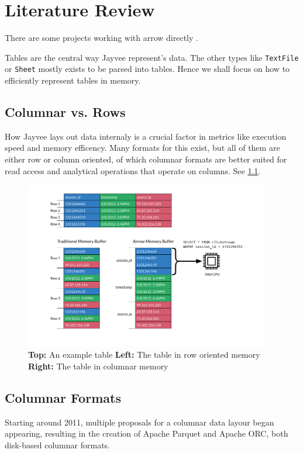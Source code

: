 \chapter{Literature Review}
\label{chapter:Literature}

There are some projects working with arrow directly
\autocite{Ahmad2020}
\autocite{Peltenburg2021}
\autocite{Grossman2022}.

Tables are the central way Jayvee represent's data.
The other types like \Verb|TextFile| or \Verb|Sheet| mostly exists to be parsed into tables.
Hence %
we shall focus on how to efficiently represent tables in memory.

\section{Columnar vs. Rows}
\label{section:column_vs_row}
How Jayvee lays out data internaly is a crucial factor in metrics like execution speed and memory efficency.
Many formats for this exist, but all of them are either row or column oriented, of which columnar formats are better suited for read access and analytical operations that operate on columns. \autocite{Floratou2019}
See \ref{fig:row_v_col}.
\begin{figure}
	\begin{center}
		\includegraphics[width=0.95\textwidth]{resources/columnar}
	\end{center}
	\caption{\textbf{Top:} An example table \textbf{Left:} The table in row oriented memory \textbf{Right:} The table in columnar memory}
	\label{fig:row_v_col}
\end{figure}


\section{Columnar Formats}
\label{section:columnar}
Starting around 2011, multiple proposals for a columnar data layour began appearing, resulting in the creation of Apache Parquet and Apache ORC, both disk-based columnar formats.

